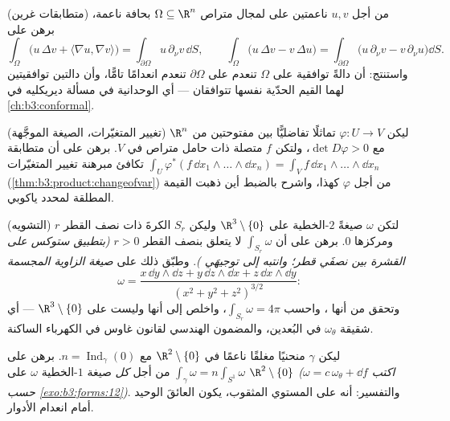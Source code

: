 \begin{exercise}[$\star\star$]\label{exo:b3:forms:8}
(متطابقات غرين) من أجل $u, v$ ناعمتين على  لمجال متراص
$\Omega \subseteq \R^n$ بحافة ناعمة، برهن على
\[
\int_\Omega\bigl(u\,\Delta v + \langle\nabla u, \nabla
v\rangle\bigr) = \int_{\partial\Omega}u\,\partial_\nu
v\,\dd S,
\qquad
\int_\Omega\bigl(u\,\Delta v - v\,\Delta u\bigr) =
\int_{\partial\Omega}\bigl(u\,\partial_\nu v -
v\,\partial_\nu u\bigr)\dd S .
\]
واستنتج: أن دالةً توافقية على $\Omega$ تنعدم على
$\partial\Omega$ تنعدم انعدامًا تامًّا، وأن دالتين توافقيتين
لهما القيم الحدّية نفسها تتوافقان --- أي الوحدانية في مسألة
ديريكليه في \cref{ch:b3:conformal}.
\end{exercise}

\begin{exercise}[$\star\star$]\label{exo:b3:forms:9}
(تغيير المتغيّرات، الصيغة الموجَّهة) ليكن $\varphi\colon U
\to V$ تماثلًا
تفاضليًّا بين مفتوحتين من $\R^n$ مع $\det
D\varphi > 0$، ولتكن $f$ متصلة
ذات حامل متراص في $V$. برهن على أن متطابقة  $\int_U\varphi^*(f\,\dd x_1\wedge\dots\wedge\dd x_n) =
\int_Vf\,\dd x_1\wedge\dots\wedge\dd x_n$
تكافئ مبرهنة تغيير المتغيّرات (\cref{thm:b3:product:changeofvar}) من أجل $\varphi$
كهذا، واشرح بالضبط أين ذهبت القيمة المطلقة لمحدد ياكوبي.
\end{exercise}

\begin{exercise}[$\star\star\star$]\label{exo:b3:forms:10}
(التشويه) لتكن $\omega$ صيغةً $2$-الخطية \emph{} على
$\R^3\setminus\{0\}$ وليكن $S_r$ الكرةَ ذات نصف القطر $r$ ومركزها $0$. برهن
على أن $\int_{S_r}\omega$ لا يتعلق بنصف القطر $r > 0$ \emph{(بتطبيق ستوكس على
القشرة بين نصفَي قطر؛ وانتبه إلى توجيهَي )}. وطبّق ذلك
على \emph{صيغة الزاوية المجسمة}
\[
\omega = \frac{x\,\dd y\wedge\dd z + y\,\dd z\wedge\dd x +
z\,\dd x\wedge\dd y}{(x^2 + y^2 + z^2)^{3/2}} :
\]
وتحقق من أنها ، واحسب $\int_{S_r}\omega = 4\pi$، واخلص إلى أنها  وليست
 على $\R^3\setminus\{0\}$ --- أي شقيقة $\omega_\theta$ في البُعدين،
والمضمون الهندسي لقانون غاوس في الكهرباء الساكنة.
\end{exercise}

\begin{exercise}[$\star\star$]\label{exo:b3:forms:11}
ليكن $\gamma$ منحنيًا مغلقًا ناعمًا في $\R^2\setminus\{0\}$ مع $n = \operatorname{Ind}_\gamma(0)$. برهن
على $\int_\gamma\omega = n\int_{S^1}\omega$ من أجل \emph{كل} صيغة $1$-الخطية  $\omega$ على
$\R^2\setminus\{0\}$ \emph{(اكتب $\omega = c\,\omega_\theta
+ \dd f$ حسب \cref{exo:b3:forms:12})}. والتفسير: أنه على
المستوي المثقوب، يكون  العائقَ الوحيد أمام انعدام
الأدوار.
\end{exercise}

